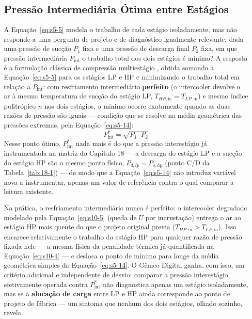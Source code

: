 \documentclass[12pt,a4paper]{article}
\numberwithin{equation}{section}
\numberwithin{table}{section}
\numberwithin{figure}{section}
\begin{document}
	\subsection{\textbf{Pressão Intermediária Ótima entre Estágios}}
	A Equação~\eqref{eq:s5-5} modela o trabalho de cada estágio isoladamente, mas não responde a uma pergunta de projeto e de diagnóstico igualmente relevante: dada uma pressão de sucção $P_1$ fixa e uma pressão de descarga final $P_2$ fixa, em que pressão intermediária $P_{\text{int}}$ o trabalho total dos dois estágios é mínimo? A resposta é a formulação clássica de compressão multiestágio \cite{cengel, moran, hanlon}, obtida somando a Equação~\eqref{eq:s5-5} para os estágios LP e HP e minimizando o trabalho total em relação a $P_{\text{int}}$: com resfriamento intermediário \textbf{perfeito} (o intercooler devolve o ar à mesma temperatura de sucção do estágio LP, $T_{HP,\text{in}} = T_{LP,\text{in}}$) e mesmo índice politrópico $n$ nos dois estágios, o mínimo ocorre exatamente quando as duas razões de pressão são iguais — condição que se resolve na média geométrica das pressões extremas, pela Equação~\eqref{eq:s5-14}:
	\begin{equation}\label{eq:s5-14}
 P_{\text{int}}^{*} = \sqrt{P_1 \cdot P_2}
\end{equation}
	Nesse ponto ótimo, $P_{\text{int}}^{*}$ nada mais é do que a pressão interestágio já instrumentada na matriz do Capítulo 18 — a descarga do estágio LP e a sucção do estágio HP são o mesmo ponto físico, $P_{d,lp} = P_{s,hp}$ (ponto C/D da Tabela~\ref{tab:18-1}) — de modo que a Equação~\eqref{eq:s5-14} não introduz variável nova a instrumentar, apenas um valor de referência contra o qual comparar a leitura existente.

	Na prática, o resfriamento intermediário nunca é perfeito: o intercooler degradado modelado pela Equação~\eqref{eq:s10-5} (queda de $U$ por incrustação) entrega o ar ao estágio HP mais quente do que o projeto original previa ($T_{HP,\text{in}} > T_{LP,\text{in}}$). Isso encarece relativamente o trabalho do estágio HP para qualquer razão de pressão fixada nele — a mesma física da penalidade térmica já quantificada na Equação~\eqref{eq:s10-4} — e desloca o ponto de mínimo para longe da média geométrica simples da Equação~\eqref{eq:s5-14}. O Gêmeo Digital ganha, com isso, um critério adicional e independente de desvio: comparar a pressão interestágio efetivamente operada contra $P_{\text{int}}^{*}$ não diagnostica apenas um estágio isoladamente, mas se a \textbf{alocação de carga} entre LP e HP ainda corresponde ao ponto de projeto de fábrica — um sintoma que nenhum dos dois estágios, olhado sozinho, revela.
\end{document}
